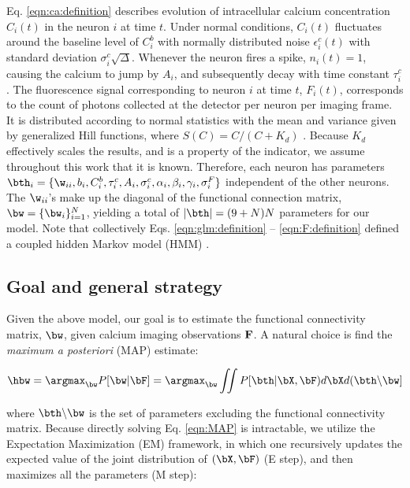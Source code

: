 Eq. \eqref{eqn:ca:definition} describes evolution of intracellular calcium concentration $C_i(t)$ in the neuron $i$ at time $t$. Under normal conditions, $C_i(t)$ fluctuates around the baseline level of $C_i^b$ with normally distributed noise $\epsilon^c_i(t)$ with standard deviation $\sigma^c_i \sqrt{\Delta}$.  Whenever the neuron fires a spike, $n_i(t)=1$, causing the calcium to jump by $A_i$, and subsequently decay with time constant $\tau^c_i$.  The fluorescence signal corresponding to neuron $i$ at time $t$, $F_i(t)$, corresponds to the count of photons collected at the detector per neuron per imaging frame. It is distributed according to normal statistics with the mean and variance given by generalized Hill functions, where $S(C)=C/(C+K_d)$ \cite{Yasuda2004}.  Because $K_d$ effectively scales the results, and is a property of the indicator, we assume throughout this work that it is known.  Therefore, each neuron has parameters $\bth_i=\{\w_{ii}, b_i, C^b_i, \tau^c_i, A_i, \sigma^c_i, \alpha_i, \beta_i, \gamma_i, \sigma^F_i\}$ independent of the other neurons.  The $\w_{ii}$'s make up the diagonal of the functional connection matrix, $\bw=\{\bw_i\}_{i=1}^N$, yielding a total of $|\bth|=(9+N)N$ parameters for our model.  Note that collectively Eqs. \eqref{eqn:glm:definition} -- \eqref{eqn:F:definition} defined a coupled hidden Markov model (HMM) \cite{ShumwayStoffer06}.


\subsection{Goal and general strategy}  \label{sec:methods:goal}

Given the above model, our goal is to estimate the functional connectivity matrix, $\bw$, given calcium imaging observations ${\bf F}$. A natural choice is find the \emph{maximum a posteriori} (MAP) estimate:

\begin{equation}\label{eqn:MAP}
\hbw=\argmax_{\bw} P[\bw| \bF] = \argmax_{\bw} \iint P[\bth| \bX, \bF) d\bX d(\bth \backslash \bw]
\end{equation}

\noindent where $\bth \backslash \bw$ is the set of parameters excluding the functional connectivity matrix.  Because directly solving Eq. \eqref{eqn:MAP} is intractable, we utilize the Expectation Maximization (EM) framework, in which one recursively updates the expected value of the joint distribution of $(\bX, \bF)$ (E step), and then maximizes all the parameters (M step):


